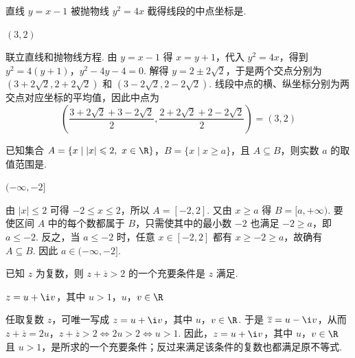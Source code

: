 \begin{problem}
直线 \( y = x - 1 \) 被抛物线 \( y^{2} = 4x \) 截得线段的中点坐标是\fillinblank{}.
\end{problem}

\begin{answer}
\((3,2)\)
\end{answer}

\begin{solution}
联立直线和抛物线方程. 由 \(y=x-1\) 得 \(x=y+1\)，代入 \(y^2=4x\)，得到
\(y^2=4(y+1)\)，\(y^2-4y-4=0\).
解得 \(y=2\pm2\sqrt{2}\)，于是两个交点分别为 \(\left(3+2\sqrt{2},2+2\sqrt{2}\right)\) 和 \(\left(3-2\sqrt{2},2-2\sqrt{2}\right)\). 线段中点的横、纵坐标分别为两交点对应坐标的平均值，因此中点为
\[
\left(\frac{3+2\sqrt{2}+3-2\sqrt{2}}{2},\frac{2+2\sqrt{2}+2-2\sqrt{2}}{2}\right)=(3,2)
\]
\end{solution}

\begin{problem}
已知集合 \(A = \{x \mid |x| \leqslant 2,\ x \in \R\}\)，\(B = \{x \mid x \geqslant a\}\)，且 \(A \subseteq B\)，则实数 \(a\) 的取值范围是\fillinblank{}.
\end{problem}

\begin{answer}
\((-\infty,-2]\)
\end{answer}

\begin{solution}
由 \(|x|\leqslant2\) 可得 \(-2\leqslant x\leqslant2\)，所以 \(A=[-2,2]\). 又由 \(x\geqslant a\) 得 \(B=[a,+\infty)\). 要使区间 \(A\) 中的每个数都属于 \(B\)，只需使其中的最小数 \(-2\) 也满足 \(-2\geqslant a\)，即 \(a\leqslant-2\). 反之，当 \(a\leqslant-2\) 时，任意 \(x\in[-2,2]\) 都有 \(x\geqslant-2\geqslant a\)，故确有 \(A\subseteq B\). 因此 \(a\in(-\infty,-2]\).
\end{solution}

\begin{problem}
已知 \(z\) 为复数，则 \(z + \overline{z} > 2\) 的一个充要条件是 \(z\) 满足\fillinblank{}.
\end{problem}

\begin{answer}
\(z=u+\i v\)，其中 \(u>1\)，\(u\)，\(v\in\R\)
\end{answer}

\begin{solution}
任取复数 \(z\)，可唯一写成 \(z=u+\i v\)，其中 \(u\)，\(v\in\R\). 于是 \(\overline{z}=u-\i v\)，从而
\(z+\overline{z}=2u\)，\(z+\overline{z}>2\Longleftrightarrow2u>2\Longleftrightarrow u>1\).
因此，\(z=u+\i v\)，其中 \(u\)，\(v\in\R\) 且 \(u>1\)，是所求的一个充要条件；反过来满足该条件的复数也都满足原不等式.
\end{solution}

